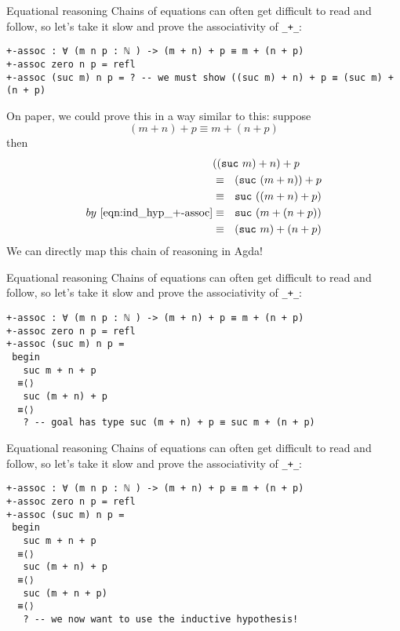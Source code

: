\documentclass[t,aspectratio=169,9pt]{beamer}
\begin{document}
\begin{frame}{Equational reasoning}
  Chains of equations can often get difficult to read and follow, so let's take
  it slow and prove the associativity of \texttt{_+_}:
\begin{verbatim}
+-assoc : ∀ (m n p : ℕ ) -> (m + n) + p ≡ m + (n + p)
+-assoc zero n p = refl
+-assoc (suc m) n p = ? -- we must show ((suc m) + n) + p ≡ (suc m) + (n + p)
\end{verbatim}
On paper, we could prove this in a way similar to this:
suppose
\begin{equation}
  \label{eqn:ind_hyp_+-assoc}
  (m + n) + p \equiv m + (n + p)
\end{equation}
then
$$
\begin{aligned}
    & ((\texttt{suc}~m) + n) + p  \\
    & \equiv ~~ (\texttt{suc}~(m + n)) + p  \\
    & \equiv ~~ \texttt{suc}~((m + n) + p) \\
 by ~ \eqref{eqn:ind_hyp_+-assoc}   &  \equiv ~~ \texttt{suc}~(m + (n + p)) \\
    & \equiv ~~ (\texttt{suc}~m) + (n + p)
\end{aligned}
$$
We can directly map this chain of reasoning in Agda!
\end{frame}

\begin{frame}{Equational reasoning}
  Chains of equations can often get difficult to read and follow, so let's take
  it slow and prove the associativity of \texttt{_+_}:
\begin{verbatim}
+-assoc : ∀ (m n p : ℕ ) -> (m + n) + p ≡ m + (n + p)
+-assoc zero n p = refl
+-assoc (suc m) n p =
 begin
   suc m + n + p
  ≡⟨⟩
   suc (m + n) + p
  ≡⟨⟩
   ? -- goal has type suc (m + n) + p ≡ suc m + (n + p)
\end{verbatim}
\end{frame}

\begin{frame}{Equational reasoning}
  Chains of equations can often get difficult to read and follow, so let's take
  it slow and prove the associativity of \texttt{_+_}:
\begin{verbatim}
+-assoc : ∀ (m n p : ℕ ) -> (m + n) + p ≡ m + (n + p)
+-assoc zero n p = refl
+-assoc (suc m) n p =
 begin
   suc m + n + p
  ≡⟨⟩
   suc (m + n) + p
  ≡⟨⟩
   suc (m + n + p)
  ≡⟨⟩
   ? -- we now want to use the inductive hypothesis!
\end{verbatim}
\end{frame}
\end{document}
